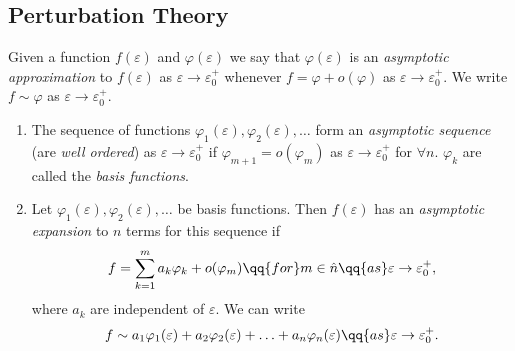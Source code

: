 
\subsection{Perturbation Theory}%
\label{sub:perturbation_theory}


\begin{frame}
    \begin{definition}
        Given a function \(f(\varepsilon)\) and \(\varphi(\varepsilon)\) we say that \(\varphi(\varepsilon)\) is an
        \emph{asymptotic approximation} to \(f(\varepsilon)\) as \(\varepsilon \to \varepsilon_0^{+}\) whenever \(f
        = \varphi + o(\varphi)\) as \(\varepsilon \to \varepsilon_0^{+}\). We write \(f \sim \varphi\) as \(\varepsilon
        \to \varepsilon_0^{+}\).
    \end{definition}
\end{frame}

\begin{frame}
    \begin{definition}
        \begin{enumerate}
            \item The sequence of functions \(\varphi_1(\varepsilon), \varphi_2(\varepsilon),\ldots\) form an
              \emph{asymptotic sequence} (are \emph{well ordered}) as \(\varepsilon \to \varepsilon_0^{+}\) if
              \(\varphi_{m+1} = o(\varphi_m)\) as \(\varepsilon \to \varepsilon_0^{+}\) for \(\forall n\).
                \pause \(\varphi_k\) are called the \emph{basis functions}. \pause
            \item<+-> Let \(\varphi_1(\varepsilon), \varphi_2(\varepsilon),\ldots\) be basis functions. Then
                \(f(\varepsilon)\) has an \emph{asymptotic expansion} to \(n\) terms for this sequence if \[
                    f =\sum_{k = 1}^{m} a_k \varphi_k + o(\varphi_m) \qq{for} m \in \hat{n} \qq{as} \varepsilon \to
                    \varepsilon_0^{+},
                \] 
                where \(a_k\) are independent of \(\varepsilon\). We can write \[
                    f \sim a_1 \varphi_1(\varepsilon) + a_2 \varphi_2(\varepsilon) + \ldots + a_n \varphi_n(\varepsilon)
                    \qq{as} \varepsilon \to \varepsilon_0^{+}.
                \]
        \end{enumerate}
    \end{definition}
\end{frame}

